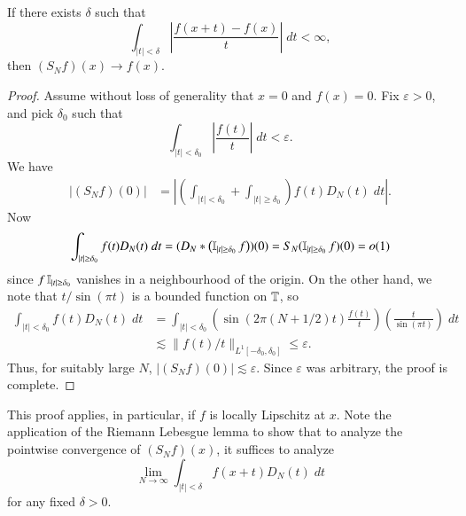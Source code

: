 \begin{theorem}
    If there exists $\delta$ such that
    \[ \int_{|t| < \delta} \left| \frac{f(x+t) - f(x)}{t} \right|\; dt < \infty, \]
    then $(S_N f)(x) \to f(x)$.
\end{theorem}
\begin{proof}
    Assume without loss of generality that $x = 0$ and $f(x) = 0$. Fix $\varepsilon > 0$, and pick $\delta_0$ such that
    \[ \int_{|t| < \delta_0} \left| \frac{f(t)}{t} \right|\; dt < \varepsilon. \]
    We have
    \begin{align*}
        |(S_N f)(0)| &= \left| \left( \int_{|t| < \delta_0} + \int_{|t| \geq \delta_0} \right) f(t) D_N(t)\; dt \right|.
    \end{align*}
    Now
    \[ \int_{|t| \geq \delta_0} f(t) D_N(t)\; dt = (D_N * \left( \operatorname{\mathbb{I}}_{|t| \geq \delta_0} f \right))(0) = S_N( \operatorname{\mathbb{I}}_{|t| \geq \delta_0} f )(0) = o(1) \]
    since $f \operatorname{\mathbb{I}}_{|t| \geq \delta_0}$ vanishes in a neighbourhood of the origin. On the other hand, we note that $t/\sin(\pi t)$ is a bounded function on $\operatorname{\mathbb{T}}$, so
    \begin{align*}
        \int_{|t| < \delta_0} f(t) D_N(t)\; dt &= \int_{|t| < \delta_0} \left( \sin(2 \pi (N + 1/2)t) \frac{f(t)}{t} \right) \left( \frac{t}{\sin(\pi t)} \right)\; dt\\
        &\lesssim \| f(t)/t \|_{L^1[-\delta_0,\delta_0]} \leq \varepsilon.
    \end{align*}
    Thus, for suitably large $N$, $|(S_N f)(0)| \lesssim \varepsilon$. Since $\varepsilon$ was arbitrary, the proof is complete.
\end{proof}

This proof applies, in particular, if $f$ is locally Lipschitz at $x$. Note the application of the Riemann Lebesgue lemma to show that to analyze the pointwise convergence of $(S_N f)(x)$, it suffices to analyze
%
\[ \lim_{N \to \infty} \int_{|t| < \delta} f(x+t) D_N(t)\; dt \]
%
for any fixed $\delta > 0$.

